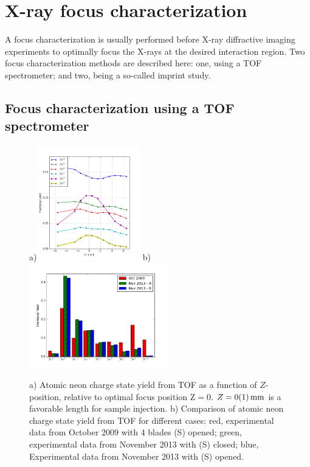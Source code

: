 \section{X-ray focus characterization}\label{sec:focus-characterization}
%
A focus characterization is usually performed before X-ray diffractive imaging experiments to optimally focus the X-rays at the desired interaction region. Two focus characterization methods are described here: one, using a TOF spectrometer; and two, being a so-called imprint study.
%
%
%
\subsection{Focus characterization using a TOF spectrometer}
%
\begin{figure}
	\centering
		a)\includegraphics[width=0.40\textwidth]{images/Focus-z-scan.png}
		b)\includegraphics[width=0.54\textwidth]{images/Focus-Fractional-Yield.png}
	\caption[Focal spot analysis using a time-of-flight ion spectrometer.]{a) Atomic neon charge state yield from TOF as a function of $Z$-position, relative to optimal focus position $\text{Z}=0$. $Z=\SI{0\pm 1}{\milli\meter}$ is a favorable length for sample injection. b) Comparison of atomic neon charge state yield from TOF for different cases: red, experimental data from October 2009 with 4 blades (S) opened; green, experimental data from November 2013 with (S) closed; blue, Experimental data from November 2013 with (S) opened.}
	\label{fig:Focus-z-scan}
\end{figure}
